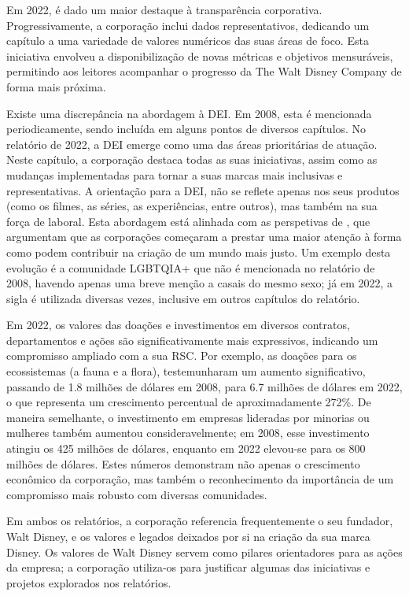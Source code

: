 \documentclass[portuguese]{textolivre}
\begin{document}
Em 2022, é dado um maior destaque à transparência corporativa. Progressivamente, a corporação inclui dados representativos, dedicando um capítulo a uma variedade de valores numéricos das suas áreas de foco. Esta iniciativa envolveu a disponibilização de novas métricas e objetivos mensuráveis, permitindo aos leitores acompanhar o progresso da The Walt Disney Company de forma mais próxima. 

Existe uma discrepância na abordagem à DEI. Em 2008, esta é mencionada periodicamente, sendo incluída em alguns pontos de diversos capítulos. No relatório de 2022, a DEI emerge como uma das áreas prioritárias de atuação. Neste capítulo, a corporação destaca todas as suas iniciativas, assim como as mudanças implementadas para tornar a suas marcas mais inclusivas e representativas. A orientação para a DEI, não se reflete apenas nos seus produtos (como os filmes, as séries, as experiências, entre outros), mas também na sua força de laboral. Esta abordagem está alinhada com as perspetivas de \textcite{human_human_2022,hessekiel_2023_2023}, que argumentam que as corporações começaram a prestar uma maior atenção à forma como podem contribuir na criação de um mundo mais justo. Um exemplo desta evolução é a comunidade LGBTQIA+ que não é mencionada no relatório de 2008, havendo apenas uma breve menção a casais do mesmo sexo; já em 2022, a sigla é utilizada diversas vezes, inclusive em outros capítulos do relatório. 

Em 2022, os valores das doações e investimentos em diversos contratos, departamentos e ações são significativamente mais expressivos, indicando um compromisso ampliado com a sua RSC. Por exemplo, as doações para os ecossistemas (a fauna e a flora), testemunharam um aumento significativo, passando de 1.8 milhões de dólares em 2008, para 6.7 milhões de dólares em 2022, o que representa um crescimento percentual de aproximadamente 272\%.  De maneira semelhante, o investimento em empresas lideradas por minorias ou mulheres também aumentou consideravelmente; em 2008, esse investimento atingiu os 425 milhões de dólares, enquanto em 2022 elevou-se para os 800 milhões de dólares. Estes números demonstram não apenas o crescimento econômico da corporação, mas também o reconhecimento da importância de um compromisso mais robusto com diversas comunidades. 

Em ambos os relatórios, a corporação referencia frequentemente o seu fundador, Walt Disney, e os valores e legados deixados por si na criação da sua marca Disney. Os valores de Walt Disney servem como pilares orientadores para as ações da empresa; a corporação utiliza-os para justificar algumas das iniciativas e projetos explorados nos relatórios. 
\end{document}

